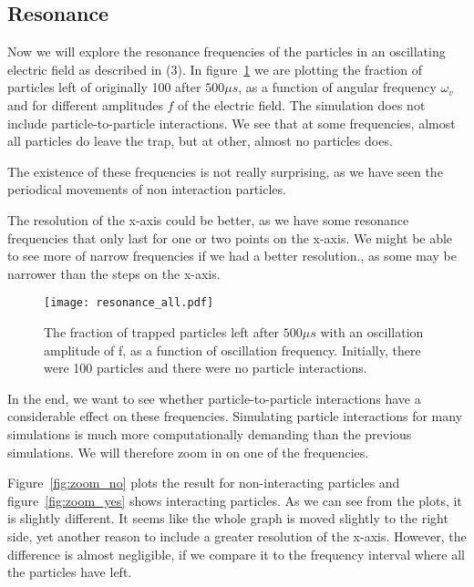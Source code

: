 \documentclass[english,notitlepage,reprint,nofootinbib]{revtex4-1}
\begin{document}
\subsection*{Resonance}

Now we will explore the resonance frequencies of the particles in an oscillating electric field as described in (3). In figure~\ref{fig:resonance_all} we are plotting the fraction of particles left of originally 100 after $500 \mu s$, as a function of angular frequency $\omega_v$ and for different amplitudes $f$ of the electric field. The simulation does not include particle-to-particle interactions. We see that at some frequencies, almost all particles do leave the trap, but at other, almost no particles does.

The existence of these frequencies is not really surprising, as we have seen the periodical movements of non interaction particles.

The resolution of the x-axis could be better, as we have some resonance frequencies that only last for one or two points on the x-axis. We might be able to see more of narrow frequencies if we had a better resolution., as some may be narrower than the steps on the x-axis. 

\FloatBarrier
\begin{figure}[ht]
    \centering %
    \texttt{[image: resonance\_all.pdf]} %
    \caption{The fraction of trapped particles left after $500 \mu s$ with an oscillation amplitude of f, as a function of oscillation frequency. Initially, there were 100 particles and there were no particle interactions.}
    \label{fig:resonance_all}
\end{figure}
\FloatBarrier


In the end, we want to see whether particle-to-particle interactions have a considerable effect on these frequencies. Simulating particle interactions for many simulations is much more computationally demanding than the previous simulations. We will therefore zoom in on one of the frequencies. 

Figure~\ref{fig:zoom_no} plots the result for non-interacting particles and figure~\ref{fig:zoom_yes} shows interacting particles. As we can see from the plots, it is slightly different. It seems like the whole graph is moved slightly to the right side, yet another reason to include a greater resolution of the x-axis. However, the difference is almost negligible, if we compare it to the frequency interval where all the particles have left. 
\end{document}
